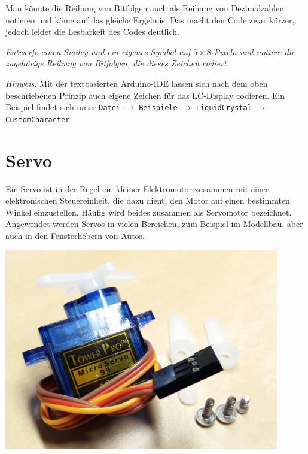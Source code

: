 \begin{aufgabe}
	Man könnte die Reihung von Bitfolgen auch als Reihung von Dezimalzahlen notieren und käme auf das gleiche Ergebnis. Das macht den Code zwar kürzer, jedoch leidet die Lesbarkeit des Codes deutlich.
	
	\emph{Entwerfe einen Smiley und ein eigenes Symbol auf $5 \times 8$ Pixeln und notiere die zugehörige Reihung von Bitfolgen, die dieses Zeichen codiert.}
	
	\emph{Hinweis:} Mit der textbasierten Arduino-IDE lassen sich nach dem oben beschriebenen Prinzip auch eigene Zeichen für das LC-Display codieren. Ein Beispiel findet sich unter \texttt{Datei} $\rightarrow$ \texttt{Beispiele} $\rightarrow$ \texttt{LiquidCrystal} $\rightarrow$ \texttt{CustomCharacter}.
\end{aufgabe}


\newpage
\section{Servo}
\label{sec:servo}
\setcounter{aufgabennummer}{0}
\setcounter{projektnummer}{0}
\begin{minipage}{0.7\textwidth}
	Ein Servo ist in der Regel ein kleiner Elektromotor zusammen mit einer elektronischen Steuereinheit, die dazu dient, den Motor auf einen bestimmten Winkel einzustellen. Häufig wird beides zusammen als Servomotor bezeichnet. Angewendet werden Servos in vielen Bereichen, zum Beispiel im Modellbau, aber auch in den Fensterhebern von Autos.
\end{minipage}
\hfill
\begin{minipage}{0.28\textwidth}
	\centering
	\includegraphics[width=0.9\textwidth]{./pics/servo.png}
\end{minipage}


